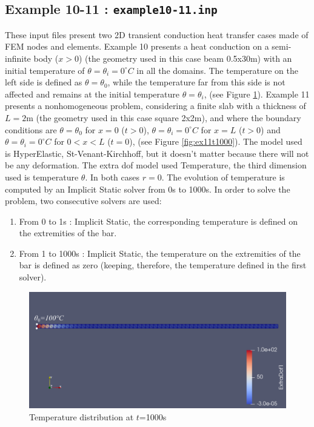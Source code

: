 \documentclass[oneside,11pt,times]{book}
\begin{document}
\subsection{Example 10-11 : \texttt{example10-11.inp}}
These input files present two 2D transient conduction heat transfer cases made of FEM nodes and elements. Example 10 presents a heat conduction on a semi-infinite body ($x>0$) (the geometry used in this case beam 0.5x30m) with an initial temperature of $\theta=\theta_i=0  ^{\circ}C$ in all the domains. The temperature on the left side is defined as $\theta=\theta_0$, while the temperature far from this side is not affected and remains at the initial temperature $\theta=\theta_i$, (see Figure \ref{fig:ex10t1000}). Example 11 presents a nonhomogeneous problem, considering a finite slab with a thickness of $L=2$m (the geometry used in this case square 2x2m), and where the boundary conditions are $\theta=\theta_0$ for $x=0$ ($t>0$), $\theta=\theta_i=0  ^{\circ}C$ for $x=L$ ($t>0$) and $\theta=\theta_i=0  ^{\circ}C$ for $0<x<L$ ($t=0$), (see Figure \ref{fig:ex11t1000}). The model used is HyperElastic, St-Venant-Kirchhoff, but it doesn't matter because there will not be any deformation. The extra dof model used Temperature, the third dimension used is temperature $\theta$. In both cases $r=0$. The evolution of temperature is computed by an Implicit Static solver from 0s to 1000s. In order to solve the problem, two consecutive solvers are used:
\begin{enumerate}
    \item From 0 to 1s : Implicit Static, the corresponding temperature is defined on the extremities of the bar.
    \item From 1 to 1000s : Implicit Static, the temperature on the extremities of the bar is defined as zero (keeping, therefore, the temperature defined in the first solver).
\end{enumerate}

\begin{figure}[h!]
    \centering
    \includegraphics[width=0.8\linewidth]{imgs/Examples/ex10.pdf}
    \caption{Temperature distribution at $t$=1000s}
    \label{fig:ex10t1000}
\end{figure}
\end{document}
